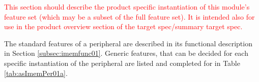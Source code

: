 \textcolor{red}{This section should describe the product specific instantiation of this module’s feature set (which may be a subset of the full feature set). It is intended also for use in the product overview section of the target spec/summary target spec.}

The standard features of a \asimemg peripheral are described in its functional description in Section \ref{subsec:imemfunc01}. Generic features, that can be decided for each specific instantiation of the peripheral are listed and completed for \asimem in Table \ref{tab:asImemPer01a}.

